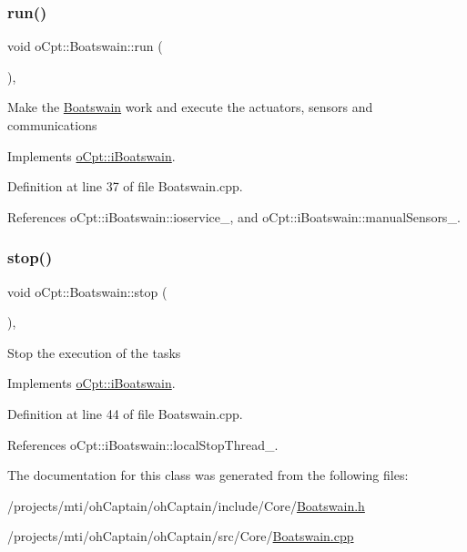 \subsubsection{\texorpdfstring{run()}{run()}}
{\footnotesize\ttfamily void o\+Cpt\+::\+Boatswain\+::run (\begin{DoxyParamCaption}{ }\end{DoxyParamCaption})\hspace{0.3cm}{\ttfamily [override]}, {\ttfamily [virtual]}}

Make the \hyperlink{classo_cpt_1_1_boatswain}{Boatswain} work and execute the actuators, sensors and communications 

Implements \hyperlink{classo_cpt_1_1i_boatswain_a4512e742ba996b32dcc452d9f180724a}{o\+Cpt\+::i\+Boatswain}.



Definition at line 37 of file Boatswain.\+cpp.



References o\+Cpt\+::i\+Boatswain\+::ioservice\+\_\+, and o\+Cpt\+::i\+Boatswain\+::manual\+Sensors\+\_\+.

\hypertarget{classo_cpt_1_1_boatswain_ad538cca1d6429dacf09b22c53291074f}{}\label{classo_cpt_1_1_boatswain_ad538cca1d6429dacf09b22c53291074f} 
\subsubsection{\texorpdfstring{stop()}{stop()}}
{\footnotesize\ttfamily void o\+Cpt\+::\+Boatswain\+::stop (\begin{DoxyParamCaption}{ }\end{DoxyParamCaption})\hspace{0.3cm}{\ttfamily [override]}, {\ttfamily [virtual]}}

Stop the execution of the tasks 

Implements \hyperlink{classo_cpt_1_1i_boatswain_ad1fb6362c814a72ea6c4dc9a9042cf5e}{o\+Cpt\+::i\+Boatswain}.



Definition at line 44 of file Boatswain.\+cpp.



References o\+Cpt\+::i\+Boatswain\+::local\+Stop\+Thread\+\_\+.



The documentation for this class was generated from the following files\+:\begin{DoxyCompactItemize}
\item 
/projects/mti/oh\+Captain/oh\+Captain/include/\+Core/\hyperlink{_boatswain_8h}{Boatswain.\+h}\item 
/projects/mti/oh\+Captain/oh\+Captain/src/\+Core/\hyperlink{_boatswain_8cpp}{Boatswain.\+cpp}\end{DoxyCompactItemize}

